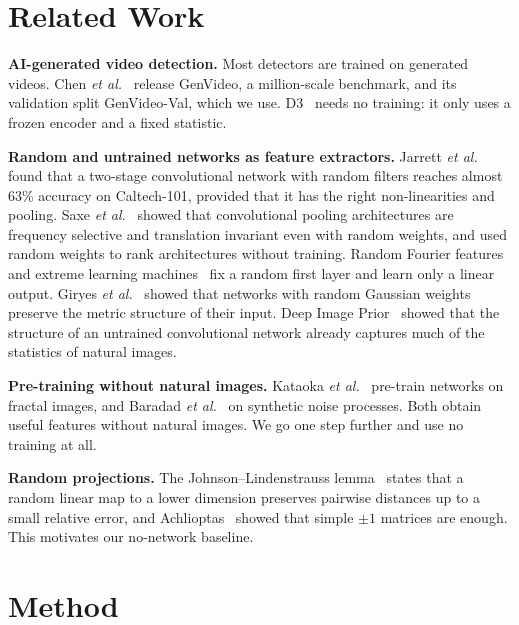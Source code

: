 \documentclass[conference]{IEEEtran}
\begin{document}
\section{Related Work}
\label{sec:related}

\textbf{AI-generated video detection.} Most detectors are trained on generated
videos. Chen \emph{et al.}~\cite{chen2024demamba} release GenVideo, a
million-scale benchmark, and its validation split GenVideo-Val, which we use.
D3~\cite{zheng2025d3} needs no training: it only uses a frozen encoder and a
fixed statistic.

\textbf{Random and untrained networks as feature extractors.} Jarrett
\emph{et al.}~\cite{jarrett2009} found that a two-stage convolutional network
with random filters reaches almost 63\% accuracy on Caltech-101, provided
that it has the right non-linearities and pooling. Saxe
\emph{et al.}~\cite{saxe2011} showed that convolutional pooling architectures
are frequency selective and translation invariant even with random weights,
and used random weights to rank architectures without training. Random Fourier
features~\cite{rahimi2007} and extreme learning machines~\cite{huang2006elm}
fix a random first layer and learn only a linear output. Giryes
\emph{et al.}~\cite{giryes2016} showed that networks with random Gaussian
weights preserve the metric structure of their input. Deep Image
Prior~\cite{ulyanov2018dip} showed that the structure of an untrained
convolutional network already captures much of the statistics of natural
images.

\textbf{Pre-training without natural images.} Kataoka
\emph{et al.}~\cite{kataoka2020fractal} pre-train networks on fractal images,
and Baradad \emph{et al.}~\cite{baradad2021noise} on synthetic noise
processes. Both obtain useful features without natural images. We go one step
further and use no training at all.

\textbf{Random projections.} The Johnson--Lindenstrauss
lemma~\cite{johnson1984} states that a random linear map to a lower dimension
preserves pairwise distances up to a small relative error, and
Achlioptas~\cite{achlioptas2003} showed that simple $\pm1$ matrices are
enough. This motivates our no-network baseline.

\section{Method}
\label{sec:method}
\end{document}
